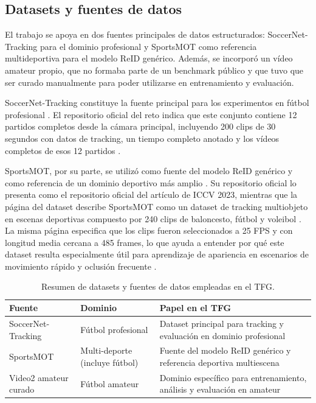\documentclass[../MAIN.tex]{subfiles}
\begin{document}
	\subsection{Datasets y fuentes de datos}
	
	El trabajo se apoya en dos fuentes principales de datos estructurados: SoccerNet-Tracking para el dominio profesional y SportsMOT como referencia multideportiva para el modelo ReID genérico. Además, se incorporó un vídeo amateur propio, que no formaba parte de un benchmark público y que tuvo que ser curado manualmente para poder utilizarse en entrenamiento y evaluación.
	
	SoccerNet-Tracking constituye la fuente principal para los experimentos en fútbol profesional \parencite{soccernet_tracking_repo}. El repositorio oficial del reto indica que este conjunto contiene 12 partidos completos desde la cámara principal, incluyendo 200 clips de 30 segundos con datos de tracking, un tiempo completo anotado y los vídeos completos de esos 12 partidos \parencite{soccernet_tracking_repo}.
	
	SportsMOT, por su parte, se utilizó como fuente del modelo ReID genérico y como referencia de un dominio deportivo más amplio \parencite{sportsmot_repo,sportsmot_dataset}. Su repositorio oficial lo presenta como el repositorio oficial del artículo de ICCV 2023, mientras que la página del dataset describe SportsMOT como un dataset de tracking multiobjeto en escenas deportivas compuesto por 240 clips de baloncesto, fútbol y voleibol \parencite{sportsmot_repo,sportsmot_dataset}. La misma página especifica que los clips fueron seleccionados a 25 FPS y con longitud media cercana a 485 frames, lo que ayuda a entender por qué este dataset resulta especialmente útil para aprendizaje de apariencia en escenarios de movimiento rápido y oclusión frecuente \parencite{sportsmot_dataset}.
	
	\begin{table}[H]
		\centering
		\caption{Resumen de datasets y fuentes de datos empleadas en el TFG.}
		\label{tab:cap4_datasets}
		\begin{tabular}{p{3.0cm}p{3.0cm}p{6.5cm}}
			\toprule
			\textbf{Fuente} & \textbf{Dominio} & \textbf{Papel en el TFG} \\
			\midrule
			SoccerNet-Tracking & Fútbol profesional & Dataset principal para tracking y evaluación en dominio profesional \\
			SportsMOT & Multi-deporte (incluye fútbol) & Fuente del modelo ReID genérico y referencia deportiva multiescena \\
			Video2 amateur curado & Fútbol amateur & Dominio específico para entrenamiento, análisis y evaluación en amateur \\
			\bottomrule
		\end{tabular}
	\end{table}
	
\end{document}
